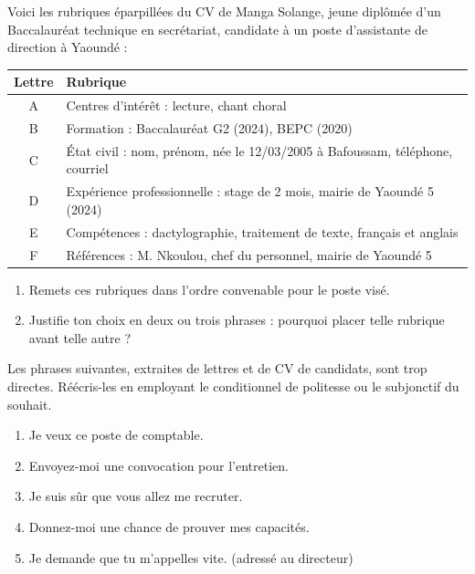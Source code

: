 \documentclass[11pt]{article}
\begin{document}
\begin{exercice}
Voici les rubriques éparpillées du CV de Manga Solange, jeune diplômée d'un Baccalauréat technique en secrétariat, candidate à un poste d'assistante de direction à Yaoundé :

\begin{center}
\begin{tabular}{|c|l|}
\hline
Lettre & Rubrique \\
\hline
A & Centres d'intérêt : lecture, chant choral \\
B & Formation : Baccalauréat G2 (2024), BEPC (2020) \\
C & État civil : nom, prénom, née le 12/03/2005 à Bafoussam, téléphone, courriel \\
D & Expérience professionnelle : stage de 2 mois, mairie de Yaoundé 5 (2024) \\
E & Compétences : dactylographie, traitement de texte, français et anglais \\
F & Références : M. Nkoulou, chef du personnel, mairie de Yaoundé 5 \\
\hline
\end{tabular}
\end{center}

\begin{enumerate}
\item Remets ces rubriques dans l'ordre convenable pour le poste visé.
\item Justifie ton choix en deux ou trois phrases : pourquoi placer telle rubrique avant telle autre ?
\end{enumerate}
\end{exercice}

\begin{exercice}
Les phrases suivantes, extraites de lettres et de CV de candidats, sont trop directes. Réécris-les en employant le conditionnel de politesse ou le subjonctif du souhait.

\begin{enumerate}
\item Je veux ce poste de comptable.
\item Envoyez-moi une convocation pour l'entretien.
\item Je suis sûr que vous allez me recruter.
\item Donnez-moi une chance de prouver mes capacités.
\item Je demande que tu m'appelles vite. (adressé au directeur)
\end{enumerate}
\end{exercice}
\end{document}
